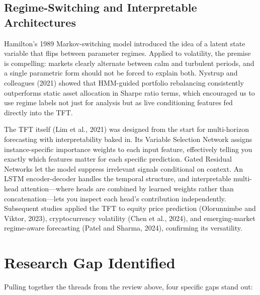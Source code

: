 \subsection{Regime-Switching and Interpretable Architectures}

Hamilton's 1989 Markov-switching model introduced the idea of a latent state variable that flips between parameter regimes. Applied to volatility, the premise is compelling: markets clearly alternate between calm and turbulent periods, and a single parametric form should not be forced to explain both. Nystrup and colleagues (2021) showed that HMM-guided portfolio rebalancing consistently outperforms static asset allocation in Sharpe ratio terms, which encouraged us to use regime labels not just for analysis but as live conditioning features fed directly into the TFT.

The TFT itself (Lim et al., 2021) was designed from the start for multi-horizon forecasting with interpretability baked in. Its Variable Selection Network assigns instance-specific importance weights to each input feature, effectively telling you exactly which features matter for each specific prediction. Gated Residual Networks let the model suppress irrelevant signals conditional on context. An LSTM encoder-decoder handles the temporal structure, and interpretable multi-head attention---where heads are combined by learned weights rather than concatenation---lets you inspect each head's contribution independently. Subsequent studies applied the TFT to equity price prediction (Olorunnimbe and Viktor, 2023), cryptocurrency volatility (Chen et al., 2024), and emerging-market regime-aware forecasting (Patel and Sharma, 2024), confirming its versatility.

\section{Research Gap Identified}

Pulling together the threads from the review above, four specific gaps stand out:

